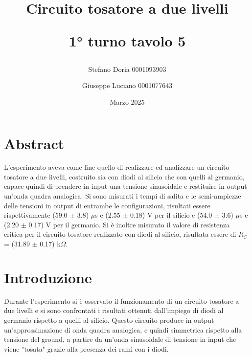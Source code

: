 \documentclass[a4paper,11pt]{article}
\begin{document}
	\title{\textbf{Circuito tosatore a due livelli}
		
		1° turno tavolo 5}
	\author{Stefano Doria 0001093903 \and Giuseppe Luciano 0001077643}
	
	\date{Marzo 2025}
	
	\maketitle
	
	\section{Abstract}
	
	L'esperimento aveva come fine quello di realizzare ed analizzare un circuito tosatore a due livelli, costruito sia con diodi al silicio che con quelli al germanio, capace quindi di prendere in input una tensione sinusoidale e restituire in output un'onda quadra analogica. Si sono misurati i tempi di salita e le semi-ampiezze delle tensioni in output di entrambe le configurazioni, risultati essere rispettivamente (59.0 $\pm$ 3.8) $\mu$s e (2.55 $\pm$ 0.18) V per il silicio e (54.0 $\pm$ 3.6) $\mu$s e (2.20 $\pm$ 0.17) V per il germanio. Si è inoltre misurato il valore di resistenza critica per il circuito tosatore realizzato con diodi al silicio, risultata essere di $R_{C}$ = (31.89 $\pm$ 0.17) k$\Omega$.
	
	
	\section{Introduzione}
	
	Durante l'esperimento si è osservato il funzionamento di un circuito tosatore a due livelli e si sono confrontati i risultati ottenuti dall'impiego di diodi al germanio rispetto a quelli al silicio. Questo circuito produce in output un'approssimazione di onda quadra analogica, e quindi simmetrica rispetto alla tensione del ground, a partire da un'onda sinusoidale di tensione in input che viene "tosata" grazie alla presenza dei rami con i diodi. 
	
\end{document}
